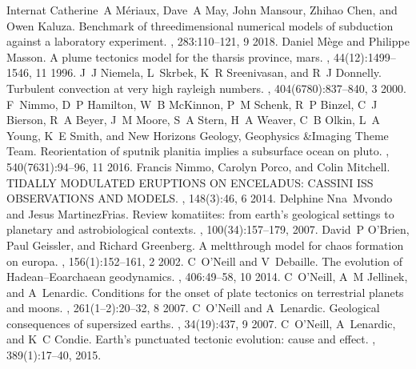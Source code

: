 \documentclass[letterpaper,10pt,english]{jupyterBook}
\begin{document}
\begin{sphinxthebibliography}{Internat}
\sphinxAtStartPar
Catherine A Mériaux, Dave A May, John Mansour, Zhihao Chen, and Owen Kaluza. Benchmark of three\sphinxhyphen{}dimensional numerical models of subduction against a laboratory experiment. , 283:110–121, 9 2018.
\sphinxAtStartPar
Daniel Mège and Philippe Masson. A plume tectonics model for the tharsis province, mars. , 44(12):1499–1546, 11 1996.
\sphinxAtStartPar
J J Niemela, L Skrbek, K R Sreenivasan, and R J Donnelly. Turbulent convection at very high rayleigh numbers. , 404(6780):837–840, 3 2000.
\sphinxAtStartPar
F Nimmo, D P Hamilton, W B McKinnon, P M Schenk, R P Binzel, C J Bierson, R A Beyer, J M Moore, S A Stern, H A Weaver, C B Olkin, L A Young, K E Smith, and New Horizons Geology, Geophysics \&Imaging Theme Team. Reorientation of sputnik planitia implies a subsurface ocean on pluto. , 540(7631):94–96, 11 2016.
\sphinxAtStartPar
Francis Nimmo, Carolyn Porco, and Colin Mitchell. TIDALLY MODULATED ERUPTIONS ON ENCELADUS: CASSINI ISS OBSERVATIONS AND MODELS. , 148(3):46, 6 2014.
\sphinxAtStartPar
Delphine Nna Mvondo and Jesus Martinez\sphinxhyphen{}Frias. Review komatiites: from earth's geological settings to planetary and astrobiological contexts. , 100(3\sphinxhyphen{}4):157–179, 2007.
\sphinxAtStartPar
David P O'Brien, Paul Geissler, and Richard Greenberg. A melt\sphinxhyphen{}through model for chaos formation on europa. , 156(1):152–161, 2 2002.
\sphinxAtStartPar
C O'Neill and V Debaille. The evolution of Hadean–Eoarchaean geodynamics. , 406:49–58, 10 2014.
\sphinxAtStartPar
C O'Neill, A M Jellinek, and A Lenardic. Conditions for the onset of plate tectonics on terrestrial planets and moons. , 261(1–2):20–32, 8 2007.
\sphinxAtStartPar
C O'Neill and A Lenardic. Geological consequences of super\sphinxhyphen{}sized earths. , 34(19):437, 9 2007.
\sphinxAtStartPar
C O'Neill, A Lenardic, and K C Condie. Earth's punctuated tectonic evolution: cause and effect. , 389(1):17–40, 2015.

\end{sphinxthebibliography}
\end{document}
